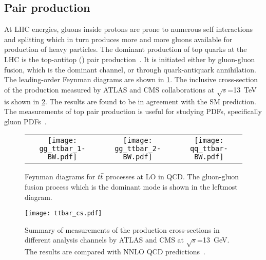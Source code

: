 \subsection*{Pair production}
At LHC energies, gluons inside protons are prone to numerous self interactions and splitting which in 
turn produces more and more gluons available for production of heavy particles. 
The dominant production of top quarks at the LHC is the top-antitop (\ttbar) pair production~\cite{ATLAS:2016zet}. It is
initiated either by gluon-gluon fusion, which is the dominant channel, or through quark-antiquark annihilation.
The leading-order Feynman diagrams are shown in \cref{fig:ttbarprod}. The inclusive cross-section
of the \ttbar production measured by ATLAS and CMS collaborations at $\sqrt{s}$=\qty{13}{\TeV} is
shown in \cref{fig:ttbar_cs}. The results are found to be in agreement with the SM prediction.
The measurements of top pair production is useful for studying PDFs, specifically 
gluon PDFs~\cite{FABBRI201763}.

\begin{figure}[htbp]
    \centering
    \begin{tabular}{ccc}
        \texttt{[image: gg\_ttbar\_1-BW.pdf]} &
        \texttt{[image: gg\_ttbar\_2-BW.pdf]} &
        \texttt{[image: qq\_ttbar-BW.pdf]} \\[1ex]
    \end{tabular}
    \caption[Feynman diagrams for $t\Bar{t}$ processes at LO in QCD]{Feynman diagrams for $t\Bar{t}$ processes at LO in QCD. The gluon-gluon fusion
    process which is the dominant mode is shown in the leftmost diagram. }
    \label{fig:ttbarprod}
\end{figure}

\begin{figure}[htbp]
    \centering
    \texttt{[image: ttbar\_cs.pdf]}
    \caption[Cross-section of the \ttbar process]{Summary of measurements of the \ttbar production
    cross-sections in different analysis channels by ATLAS and CMS at $\sqrt{s}$=\qty{13}{\GeV}. The 
    results are compared with NNLO QCD predictions~\cite{ATL-PHYS-PUB-2024-006}.}%
    \label{fig:ttbar_cs}
\end{figure}

